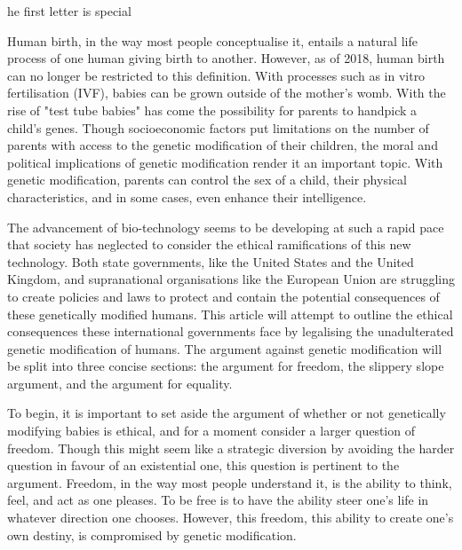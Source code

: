 \label{ch:designer-babies}

he first letter is special



   Human birth, in the way most people conceptualise it, entails a natural
   life process of one human giving birth to another. However, as of 2018,
   human birth can no longer be restricted to this definition. With
   processes such as in vitro fertilisation (IVF), babies can be grown
   outside of the mother's womb. With the rise of "test tube babies" has
   come the possibility for parents to handpick a child's genes. Though
   socioeconomic factors put limitations on the number of parents with
   access to the genetic modification of their children, the moral and
   political implications of genetic modification render it an important
   topic. With genetic modification, parents can control the sex of a
   child, their physical characteristics, and in some cases, even enhance
   their intelligence.

   The advancement of bio-technology seems to be developing at such a
   rapid pace that society has neglected to consider the ethical
   ramifications of this new technology. Both state governments, like the
   United States and the United Kingdom, and supranational organisations
   like the European Union are struggling to create policies and laws to
   protect and contain the potential consequences of these genetically
   modified humans. This article will attempt to outline the ethical
   consequences these international governments face by legalising the
   unadulterated genetic modification of humans. The argument against
   genetic modification will be split into three concise sections: the
   argument for freedom, the slippery slope argument, and the argument for
   equality.

   To begin, it is important to set aside the argument of whether or not
   genetically modifying babies is ethical, and for a moment consider a
   larger question of freedom. Though this might seem like a strategic
   diversion by avoiding the harder question in favour of an existential
   one, this question is pertinent to the argument. Freedom, in the way
   most people understand it, is the ability to think, feel, and act as
   one pleases. To be free is to have the ability steer one's life in
   whatever direction one chooses. However, this freedom, this ability to
   create one's own destiny, is compromised by genetic modification.

